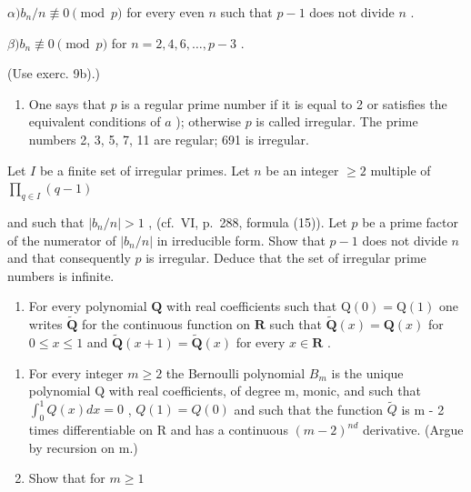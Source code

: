 \(\alpha) b_n / n \not\equiv 0 \pmod{p}\) for every even \(n\) such that \(p - 1\) does not divide \(n\) .

\(\beta) b_n \not\equiv 0 \pmod{p}\) for \(n = 2, 4, 6, \ldots, p - 3\) .

(Use exerc. 9b).)

\begin{enumerate}
\def\labelenumi{\alph{enumi})}
\setcounter{enumi}{1}
\tightlist
\item
  One says that \(p\) is a regular prime number if it is equal to 2 or satisfies the equivalent conditions of \(a\) ); otherwise \(p\) is called irregular. The prime numbers 2, 3, 5, 7, 11 are regular; 691 is irregular.
\end{enumerate}

Let \(I\) be a finite set of irregular primes. Let \(n\) be an integer \(\geqslant 2\) multiple of \(\prod_{q \in I} (q - 1)\)

and such that \(|b_n / n| > 1\) , (cf.~VI, p.~288, formula (15)). Let \(p\) be a prime factor of the numerator of \(|b_n / n|\) in irreducible form. Show that \(p - 1\) does not divide \(n\) and that consequently \(p\) is irregular. Deduce that the set of irregular prime numbers is infinite.

\begin{enumerate}
\def\labelenumi{\arabic{enumi})}
\setcounter{enumi}{11}
\tightlist
\item
  For every polynomial \(\mathbf{Q}\) with real coefficients such that \(\mathrm{Q}(0) = \mathrm{Q}(1)\) one writes \(\tilde{\mathbf{Q}}\) for the continuous function on \(\mathbf{R}\) such that \(\tilde{\mathbf{Q}}(x) = \mathbf{Q}(x)\) for \(0 \leqslant x \leqslant 1\) and \(\tilde{\mathbf{Q}}(x + 1) = \tilde{\mathbf{Q}}(x)\) for every \(x \in \mathbf{R}\) .
\end{enumerate}

\begin{enumerate}
\def\labelenumi{\alph{enumi})}
\item
  For every integer \(m \geqslant 2\) the Bernoulli polynomial \(B_{m}\) is the unique polynomial Q with real coefficients, of degree m, monic, and such that \(\int_{0}^{1} Q(x) dx = 0\) , \(Q(1) = Q(0)\) and such that the function \(\tilde{Q}\) is m - 2 times differentiable on R and has a continuous \((m - 2)^{nd}\) derivative. (Argue by recursion on m.)
\item
  Show that for \(m \geqslant 1\)
\end{enumerate}

